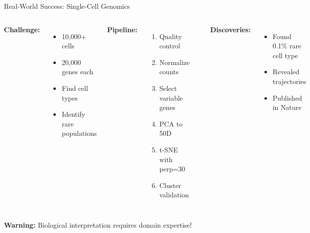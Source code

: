\documentclass[aspectratio=169]{beamer}
\newcommand{\warning}[1]{\colorbox{red!10}{\textcolor{warningcolor}{\textbf{Warning:} #1}}}
\begin{document}
\begin{frame}{Real-World Success: Single-Cell Genomics}
\begin{columns}
\textbf{Challenge:}
\begin{itemize}
\item 10,000+ cells
\item 20,000 genes each
\item Find cell types
\item Identify rare populations
\end{itemize}

\textbf{Pipeline:}
\begin{enumerate}
\item Quality control
\item Normalize counts
\item Select variable genes
\item PCA to 50D
\item t-SNE with perp=30
\item Cluster validation
\end{enumerate}

\includegraphics[width=\textwidth]{./Figures/single_cell_tsne.png}

\textbf{Discoveries:}
\begin{itemize}
\item Found 0.1\% rare cell type
\item Revealed trajectories
\item Published in Nature
\end{itemize}
\end{columns}

\warning{Biological interpretation requires domain expertise!}
\end{frame}
\end{document}

